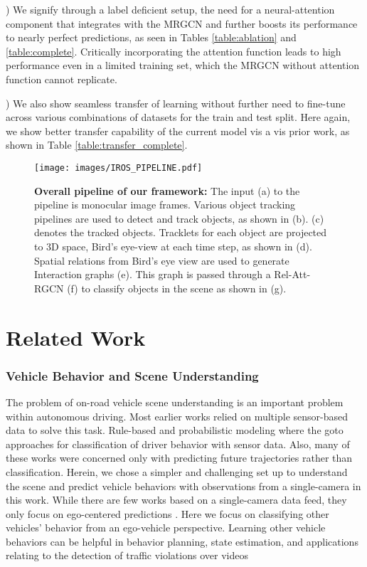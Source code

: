 \documentclass[letterpaper, 10 pt, conference]{ieeeconf}
\begin{document}
) We signify through a label deficient setup, the need for a neural-attention component that integrates with the MRGCN and further boosts its performance to nearly perfect predictions, as seen in Tables \ref{table:ablation} and \ref{table:complete}. Critically incorporating the attention function leads to high performance even in a limited training set, which the MRGCN without attention function cannot replicate. 

) We also show seamless transfer of learning without further need to fine-tune across various combinations of datasets for the train and test split. Here again, we show better transfer capability of the current model vis a vis prior work, as shown in Table \ref{table:transfer_complete}.
\begin{figure*}
    \centering
\texttt{[image: images/IROS\_PIPELINE.pdf]}
    \caption{\scriptsize \textbf{Overall pipeline of our framework:} The input (a) to the pipeline is monocular image frames. Various object tracking pipelines are used to detect and track objects, as shown in (b). (c) denotes the tracked objects. Tracklets for each object are projected to 3D space, Bird's eye-view at each time step, as shown in (d). Spatial relations from Bird's eye view are used to generate Interaction graphs (e). This graph is passed through a Rel-Att-RGCN (f) to classify objects in the scene as shown in (g).}
    \label{fig:pipeline_full}
\end{figure*}
\section{Related Work}
\subsubsection{Vehicle Behavior and Scene Understanding}
The problem of on-road vehicle scene understanding is an important problem within autonomous driving. Most earlier works relied on multiple sensor-based data to solve this task. Rule-based \cite{geng2017scenario} and probabilistic modeling \cite{DBLP:journals/corr/abs-1803-07549,sivaraman2013looking,schulz2018interaction,jain2015car, mitrovic2005reliable,sabzevari2016multi,narayanan2019dynamic} where the goto approaches for classification of driver behavior with sensor data. Also, many of these works \cite{schulz2018interaction,sabzevari2016multi} were concerned only with predicting future trajectories rather than classification.  Herein, we chose a simpler and challenging set up to understand the scene and predict vehicle behaviors with observations from a single-camera in this work. While there are few works based on a single-camera data feed, they only focus on ego-centered predictions \cite{wu2019learning}. Here we focus on classifying other vehicles' behavior from an ego-vehicle perspective. Learning other vehicle behaviors can be helpful in behavior planning, state estimation, and applications relating to the detection of traffic violations over videos
\end{document}
